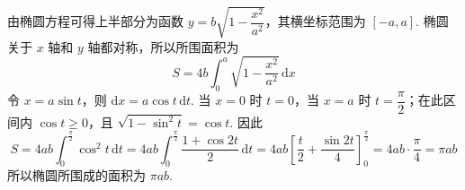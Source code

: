 \begin{solution}
由椭圆方程可得上半部分为函数 \(y=b\sqrt{1-\dfrac{x^2}{a^2}}\)，其横坐标范围为 \([-a,a]\). 椭圆关于 \(x\) 轴和 \(y\) 轴都对称，所以所围面积为
\[
S=4b\int_{0}^{a}\sqrt{1-\frac{x^2}{a^2}}\,\mathrm{d}x
\]
令 \(x=a\sin t\)，则 \(\mathrm{d}x=a\cos t\,\mathrm{d}t\). 当 \(x=0\) 时 \(t=0\)，当 \(x=a\) 时 \(t=\dfrac{\pi}{2}\)；在此区间内 \(\cos t\geqslant0\)，且 \(\sqrt{1-\sin^2t}=\cos t\). 因此
\[
S=4ab\int_{0}^{\frac{\pi}{2}}\cos^2t\,\mathrm{d}t=4ab\int_{0}^{\frac{\pi}{2}}\frac{1+\cos2t}{2}\,\mathrm{d}t=4ab\left[\frac{t}{2}+\frac{\sin2t}{4}\right]_{0}^{\frac{\pi}{2}}=4ab\cdot\frac{\pi}{4}=\pi ab
\]
所以椭圆所围成的面积为 \(\pi ab\).
\end{solution}
